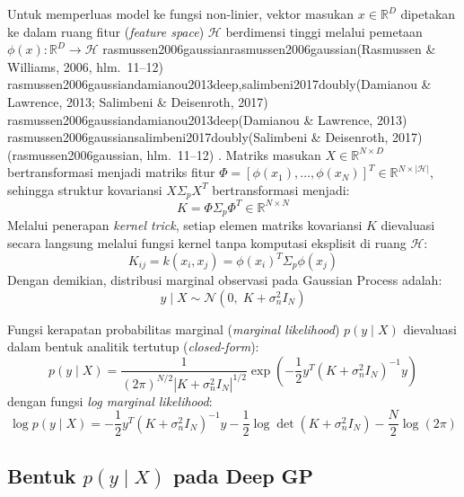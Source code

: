 \documentclass[11pt,a4paper]{article}
\def\boldsymbol#1{#1}%
\def\mathbf#1{#1}%
\newcommand{\citep}[2][]{%
  \def\tempa{#2}%
  \def\tempb{rasmussen2006gaussian}%
  \def\tempc{damianou2013deep}%
  \def\tempd{salimbeni2017doubly}%
  \def\tempe{damianou2013deep,salimbeni2017doubly}%
  \ifx\tempa\tempb(Rasmussen \& Williams, 2006\if\relax\detokenize{#1}\relax\else, #1\fi)%
  \else\ifx\tempa\tempe(Damianou \& Lawrence, 2013; Salimbeni \& Deisenroth, 2017)%
  \else\ifx\tempa\tempc(Damianou \& Lawrence, 2013)%
  \else\ifx\tempa\tempd(Salimbeni \& Deisenroth, 2017)%
  \else(#2\if\relax\detokenize{#1}\relax\else, #1\fi)%
  \fi\fi\fi\fi%
}
\theoremstyle{plain}
\theoremstyle{definition}
\theoremstyle{remark}
\begin{document}
\noindent Untuk memperluas model ke fungsi non-linier, vektor masukan $\mathbf{x} \in \mathbb{R}^D$ dipetakan ke dalam ruang fitur (\textit{feature space}) $\mathcal{H}$ berdimensi tinggi melalui pemetaan $\boldsymbol{\phi}(\mathbf{x}): \mathbb{R}^D \to \mathcal{H}$ \citep[hlm.~11--12]{rasmussen2006gaussian}. Matriks masukan $X \in \mathbb{R}^{N \times D}$ bertransformasi menjadi matriks fitur $\Phi = [\boldsymbol{\phi}(\mathbf{x}_1), \dots, \boldsymbol{\phi}(\mathbf{x}_N)]^T \in \mathbb{R}^{N \times |\mathcal{H}|}$, sehingga struktur kovariansi $X \Sigma_p X^T$ bertransformasi menjadi:
\begin{equation}
    K = \Phi \Sigma_p \Phi^T \in \mathbb{R}^{N \times N} \label{eq:kovariansi_fitur}
\end{equation}
Melalui penerapan \textit{kernel trick}, setiap elemen matriks kovariansi $K$ dievaluasi secara langsung melalui fungsi kernel tanpa komputasi eksplisit di ruang $\mathcal{H}$:
\begin{equation}
    K_{ij} = k(\mathbf{x}_i, \mathbf{x}_j) = \boldsymbol{\phi}(\mathbf{x}_i)^T \Sigma_p \boldsymbol{\phi}(\mathbf{x}_j) \label{eq:kernel_trick}
\end{equation}
Dengan demikian, distribusi marginal observasi pada Gaussian Process adalah:
\begin{equation}
    \mathbf{y} \mid X \sim \mathcal{N}\left(\mathbf{0}, \; K + \sigma_n^2 I_N\right) \label{eq:distribusi_y_gp}
\end{equation}

\noindent Fungsi kerapatan probabilitas marginal (\textit{marginal likelihood}) $p(\mathbf{y} \mid X)$ dievaluasi dalam bentuk analitik tertutup (\textit{closed-form}):
\begin{equation}
    p(\mathbf{y} \mid X) = \frac{1}{(2\pi)^{N/2} \left| K + \sigma_n^2 I_N \right|^{1/2}} \exp\left( -\frac{1}{2}\mathbf{y}^T \left(K + \sigma_n^2 I_N\right)^{-1} \mathbf{y} \right) \label{eq:marginal_likelihood_densitas}
\end{equation}
dengan fungsi \textit{log marginal likelihood}:
\begin{equation}
    \log p(\mathbf{y} \mid X) = -\frac{1}{2}\mathbf{y}^T \left(K + \sigma_n^2 I_N\right)^{-1} \mathbf{y} - \frac{1}{2}\log \det\left(K + \sigma_n^2 I_N\right) - \frac{N}{2}\log(2\pi) \label{eq:log_marginal_likelihood}
\end{equation}

\subsection{Bentuk \texorpdfstring{$p(\mathbf{y} \mid X)$}{p(y|X)} pada Deep GP}
\label{subsec:intraktabilitas_dgp}
\end{document}
